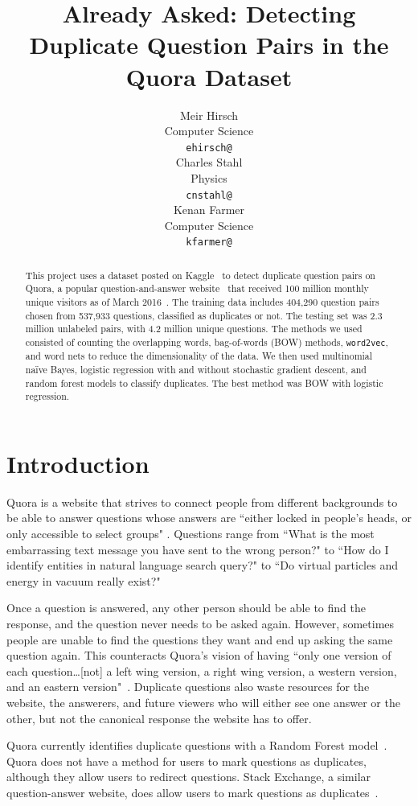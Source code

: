 \documentclass{article} %
\title{Already Asked: Detecting Duplicate Question Pairs in the Quora Dataset}
\author{
	Meir Hirsch \\
	Computer Science\\
	\texttt{ehirsch@} \\
	\And
	Charles Stahl \\
	Physics \\
	\texttt{cnstahl@} \\
	\And
	Kenan Farmer\\
	Computer Science \\
	\texttt{kfarmer@}\\
}
\newcommand{\wordtvec}{\texttt{word2vec}}
\begin{document}
	
	\maketitle
	
	\begin{abstract}
		This project uses a dataset posted on Kaggle~\cite{kaggleComp} to detect duplicate question pairs on Quora, a popular question-and-answer website~\cite{quora} that received 100 million monthly unique visitors as of March 2016~\cite{qvisit}. The training data includes 404,290 question pairs chosen from 537,933 questions, classified as duplicates or not. The testing set was 2.3 million unlabeled pairs, with 4.2 million unique questions. The methods we used consisted of counting the overlapping words, bag-of-words (BOW) methods, \wordtvec, and word nets to reduce the dimensionality of the data. We then used multinomial na\"ive Bayes, logistic regression with and without stochastic gradient descent, and random forest models to classify duplicates. The best method was BOW with logistic regression.
	\end{abstract}
	
	\section{Introduction}
	
	Quora is a website that strives to connect people from different backgrounds to be able to answer questions whose answers are ``either locked in people’s heads, or only accessible to select groups" \cite{quora}. Questions range from ``What is the most embarrassing text message you have sent to the wrong person?" to ``How do I identify entities in natural language search query?" to ``Do virtual particles and energy in vacuum really exist?"
	
	Once a question is answered, any other person should be able to find the response, and the question never needs to be asked again. However, sometimes people are unable to find the questions they want and end up asking the same question again. This counteracts Quora's vision of having ``only one version of each question\dots [not] a left wing version, a right wing version, a western version, and an eastern version"~\cite{quora}. Duplicate questions also waste resources for the website, the answerers, and future viewers who will either see one answer or the other, but not the canonical response the website has to offer.
	
	Quora currently identifies duplicate questions with a Random Forest model~\cite{kaggleComp}. Quora does not have a method for users to mark questions as duplicates, although they allow users to redirect questions. Stack Exchange, a similar question-answer website, does allow users to mark questions as duplicates~\cite{stackdup}. 
	
\end{document}
